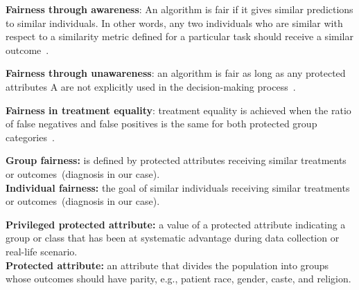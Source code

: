\begin{definition}
    \textbf{Fairness through awareness}: An algorithm is fair if it gives similar predictions to similar individuals. In other words, any two individuals who are similar with respect to a similarity metric defined for a particular task should receive a similar outcome~\cite{verma2018fairness}.
\end{definition}
\vspace{-4mm}
\begin{definition}
    \textbf{Fairness through unawareness}: an algorithm is fair as long as any protected attributes A are not explicitly used in the decision-making process~\cite{verma2018fairness}.
\end{definition}
\vspace{-4mm}
\begin{definition}
    \textbf{Fairness in treatment equality}: treatment equality is achieved when the ratio of false negatives and false positives is the same for both protected group categories~\cite{verma2018fairness}.
\end{definition}

\begin{tcolorbox}[colback=white!3!white,colframe=gray!120!black,title=\faBook~Individual vs. group fairness]
    \scriptsize{
    \textbf{Group fairness:} is defined by protected attributes receiving similar treatments or outcomes~(diagnosis in our case).\\
    \textbf{Individual fairness:} the goal of similar individuals receiving similar treatments or outcomes~(diagnosis in our case).
}
\end{tcolorbox}

\begin{tcolorbox}[colback=white!3!white,colframe=gray!120!black,title=\faBook~Protected attributes]
    \scriptsize{
    \textbf{Privileged protected attribute:} a value of a protected attribute indicating a group or class that has  been at systematic advantage during data collection or real-life scenario. \\
    \textbf{Protected attribute:} an attribute that divides the population into groups whose outcomes should have parity, e.g., patient race, gender, caste, and religion.
}
\end{tcolorbox}

